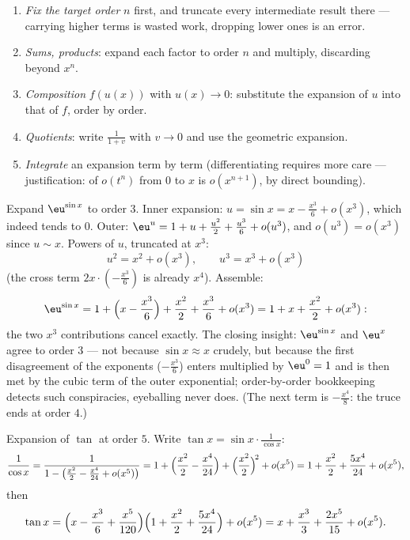 \begin{method}\label{met:b1:taylor:compute}
\begin{enumerate}
  \item \emph{Fix the target order} $n$ first, and truncate every
        intermediate result there --- carrying higher terms is
        wasted work, dropping lower ones is an error.
  \item \emph{Sums, products}: expand each factor to order $n$ and
        multiply, discarding beyond $x^n$.
  \item \emph{Composition} $f(u(x))$ with $u(x) \to 0$: substitute
        the expansion of $u$ into that of $f$, order by order.
  \item \emph{Quotients}: write $\frac{1}{1 + v}$ with $v \to 0$ and
        use the geometric expansion.
  \item \emph{Integrate} an expansion term by term (differentiating
        requires more care --- justification:  of $o(t^n)$
        from $0$ to $x$ is $o(x^{n+1})$, by direct bounding).
\end{enumerate}
\end{method}

\begin{example}\label{ex:b1:taylor:esin}
Expand $\eu^{\sin x}$ to order $3$. Inner expansion: $u = \sin x
= x - \frac{x^3}{6} + o(x^3)$, which indeed tends to $0$. Outer:
$\eu^u = 1 + u + \frac{u^2}{2} + \frac{u^3}{6} + o(u^3)$, and
$o(u^3) = o(x^3)$ since $u \sim x$. Powers of $u$, truncated at
$x^3$:
\[
u^2 = x^2 + o(x^3), \qquad u^3 = x^3 + o(x^3)
\]
(the cross term $2x\cdot(-\frac{x^3}{6})$ is already $x^4$).
Assemble:
\[
\eu^{\sin x} = 1 + \Bigl(x - \frac{x^3}{6}\Bigr) + \frac{x^2}{2}
+ \frac{x^3}{6} + o(x^3)
= 1 + x + \frac{x^2}{2} + o(x^3) :
\]
the two $x^3$ contributions cancel exactly. The closing insight:
$\eu^{\sin x}$ and $\eu^x$ agree to order $3$ --- not
because $\sin x \approx x$ crudely, but because the first
disagreement of the exponents ($-\frac{x^3}{6}$) enters
multiplied by $\eu^0 = 1$ and is then met by the cubic term of
the outer exponential; order-by-order bookkeeping detects such
conspiracies, eyeballing never does. (The next term is
$-\frac{x^4}{8}$: the truce ends at order $4$.)
\end{example}

\begin{example}\label{ex:b1:taylor:tan}
Expansion of $\tan$ at order $5$. Write $\tan x =
\sin x \cdot \frac{1}{\cos x}$:
\[
\frac{1}{\cos x} = \frac{1}{1 - \bigl(\frac{x^2}{2} - \frac{x^4}{24}
+ o(x^5)\bigr)}
= 1 + \Bigl(\frac{x^2}{2} - \frac{x^4}{24}\Bigr)
+ \Bigl(\frac{x^2}{2}\Bigr)^{\!2} + o(x^5)
= 1 + \frac{x^2}{2} + \frac{5x^4}{24} + o(x^5),
\]
then
\[
\tan x = \Bigl(x - \frac{x^3}{6} + \frac{x^5}{120}\Bigr)
\Bigl(1 + \frac{x^2}{2} + \frac{5x^4}{24}\Bigr) + o(x^5)
= x + \frac{x^3}{3} + \frac{2x^5}{15} + o(x^5) .
\]
\end{example}

